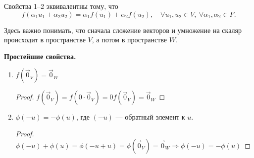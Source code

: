 \begin{Comment}
Свойства 1--2 эквивалентны тому, что 
\[
f(\alpha_1 u_1 + \alpha_2 u_2) = \alpha_1f(u_1) + \alpha_2f(u_2), \quad \forall u_1, u_2 \in V,\ \forall \alpha_1, \alpha_2 \in F.
\]
\end{Comment}
Здесь важно понимать, что сначала сложение векторов и умножение на скаляр происходит в пространстве $V$, а потом в пространстве $W$.

\vspace{0.3cm}
\textbf{Простейшие свойства.}
\begin{enumerate}
\item $f(\vec{0}_V) = \vec{0}_W$
\begin{proof}
$f(\vec{0}_V) = f(0 \cdot \vec{0}_V) = 0f(\vec{0}_V) = \vec{0}_W$
\end{proof}
\item $\phi(-u) = -\phi(u)$, где $(-u)$ --- обратный элемент к $u$.
\begin{proof}
$\phi(-u) + \phi(u) = \phi(-u+u) = \phi(\vec{0}_V) = \vec{0}_W \Rightarrow \phi(-u) = -\phi(u)$
\end{proof}
\end{enumerate}

